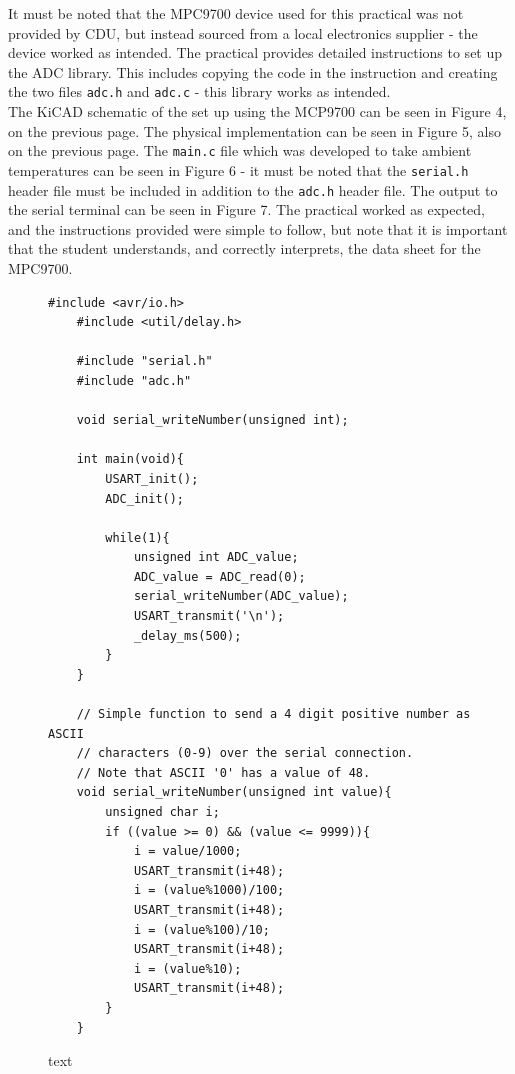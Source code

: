 \documentclass[a4paper]{article}
\begin{document}
\newpage

It must be noted that the MPC9700 device used for this practical was not provided by CDU, but instead sourced from a local electronics supplier - the device worked as intended. The practical provides detailed instructions to set up the ADC library. This includes copying the code in the instruction and creating the two files \verb|adc.h| and \verb|adc.c| - this library works as intended.\\

The KiCAD schematic of the set up using the MCP9700 can be seen in Figure 4, on the previous page. The physical implementation can be seen in Figure 5, also on the previous page. The \verb|main.c| file which was developed to take ambient temperatures can be seen in Figure 6 - it must be noted that the \verb|serial.h| header file must be included in addition to the \verb|adc.h| header file. The output to the serial terminal can be seen in Figure 7. The practical worked as expected, and the instructions provided were simple to follow, but note that it is important that the student understands, and correctly interprets, the data sheet for the MPC9700.\\
\vspace{1cm}
\begin{figure}[h]
	\begin{lstlisting}[style=CStyle]
	#include <avr/io.h>
	#include <util/delay.h>
	
	#include "serial.h"
	#include "adc.h"
	
	void serial_writeNumber(unsigned int);
	
	int main(void){
		USART_init();
		ADC_init();
	
		while(1){
			unsigned int ADC_value;
			ADC_value = ADC_read(0);
			serial_writeNumber(ADC_value);
			USART_transmit('\n');
			_delay_ms(500);
		}
	}
	
	// Simple function to send a 4 digit positive number as ASCII
	// characters (0-9) over the serial connection.
	// Note that ASCII '0' has a value of 48.
	void serial_writeNumber(unsigned int value){
		unsigned char i;
		if ((value >= 0) && (value <= 9999)){
			i = value/1000;
			USART_transmit(i+48);
			i = (value%1000)/100;
			USART_transmit(i+48);
			i = (value%100)/10;
			USART_transmit(i+48);
			i = (value%10);
			USART_transmit(i+48);
		}
	}
	\end{lstlisting}
	\caption{text}
\end{figure}
\end{document}

